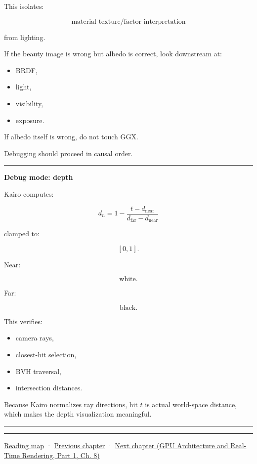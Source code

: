 This isolates:

\[
\text{material texture/factor interpretation}
\]

from lighting.

If the beauty image is wrong but albedo is correct, look downstream at:

\begin{itemize}
\tightlist
\item
  BRDF,
\item
  light,
\item
  visibility,
\item
  exposure.
\end{itemize}

If albedo itself is wrong, do not touch GGX.

Debugging should proceed in causal order.

\begin{center}\rule{0.5\linewidth}{0.5pt}\end{center}

\textbf{Debug mode: depth}

Kairo computes:

\[
d_n
=
1-
\frac{
t-d_{\text{near}}
}{
d_{\text{far}}-d_{\text{near}}
}
\]

clamped to:

\[
[0,1].
\]

Near:

\[
\text{white}.
\]

Far:

\[
\text{black}.
\]

This verifies:

\begin{itemize}
\tightlist
\item
  camera rays,
\item
  closest-hit selection,
\item
  BVH traversal,
\item
  intersection distances.
\end{itemize}

Because Kairo normalizes ray directions, hit \(t\) is actual world-space distance, which makes the depth visualization meaningful.

\begin{center}\rule{0.5\linewidth}{0.5pt}\end{center}

\begin{center}\rule{0.5\linewidth}{0.5pt}\end{center}

\hyperref[volume-reading-map]{Reading map} · \hyperref[03-visual-computing-i-ch009-point-lights-mis-and-environment-lighting]{Previous chapter} · \href{../06-GPU-Architecture-and-Real-Time-Rendering-P01/main.pdf\#03-visual-computing-i-ch011-bvh-traversal-and-deterministic-evidence}{Next chapter (GPU Architecture and Real-Time Rendering, Part 1, Ch. 8)}
